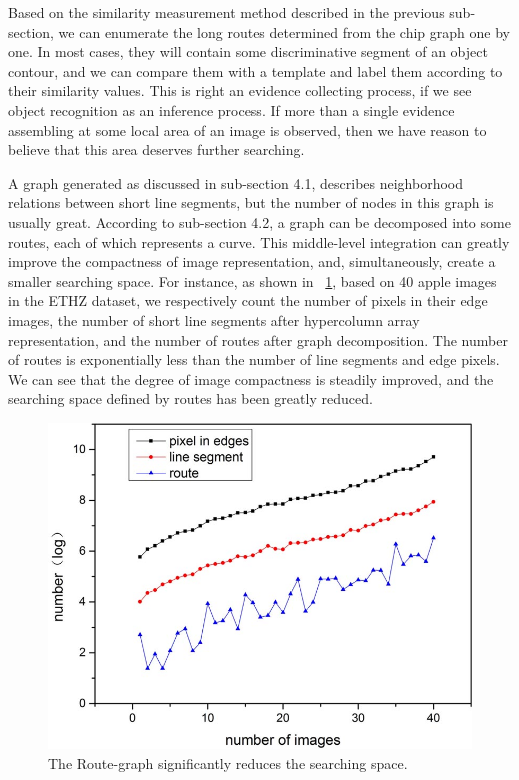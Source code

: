 \documentclass[journal]{IEEEtran}
\begin{document}
Based on the similarity measurement method described in the previous sub-section, 
we can enumerate the long routes determined from the chip graph one by one. 
In most cases, they will contain some discriminative segment of an object contour, 
and we can compare them with a template and label them according to their similarity values. 
This is right an evidence collecting process, 
if we see object recognition as an inference process. 
If more than a single evidence assembling at some local area of an image is observed, 
then we have reason to believe that this area deserves further searching.

A graph generated as discussed in sub-section 4.1, 
describes neighborhood relations between short line segments, 
but the number of nodes in this graph is usually great. 
According to sub-section 4.2, a graph can be decomposed into some routes, each of which represents a curve. 
This middle-level integration can greatly improve the compactness of image representation, 
and, simultaneously, create a smaller searching space. 
For instance, as shown in \figurename~\ref{fig:14}, based on 40 apple images in the ETHZ dataset, 
we respectively count the number of pixels in their edge images, the number of short line segments after hypercolumn array representation, and the number of routes after graph decomposition. 
The number of routes is exponentially less than the number of line segments and edge pixels.
We can see that the degree of image compactness is steadily improved, 
and the searching space defined by routes has been greatly reduced. 

\begin{figure}[!t]
\centering
\includegraphics[width=0.6\linewidth]{images/fig14.jpg}
\caption{The Route-graph significantly reduces the searching space.}
\label{fig:14}
\end{figure}
\end{document}
